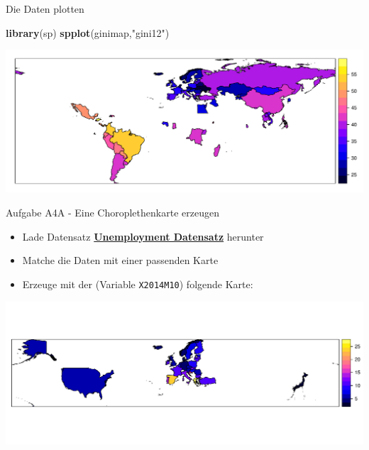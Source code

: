 \documentclass[ignorenonframetext,]{beamer}
\newenvironment{Shaded}{\begin{snugshade}}{\end{snugshade}}
\newcommand{\KeywordTok}[1]{\textcolor[rgb]{0.13,0.29,0.53}{\textbf{#1}}}
\newcommand{\NormalTok}[1]{#1}
\newcommand{\StringTok}[1]{\textcolor[rgb]{0.31,0.60,0.02}{#1}}
\providecommand{\tightlist}{%
  \setlength{\itemsep}{0pt}\setlength{\parskip}{0pt}}
\begin{document}
\begin{frame}[fragile]{Die Daten plotten}
\protect\hypertarget{die-daten-plotten}{}

\begin{Shaded}
\begin{Highlighting}[]
\KeywordTok{library}\NormalTok{(sp)}
\KeywordTok{spplot}\NormalTok{(ginimap,}\StringTok{"gini12"}\NormalTok{)}
\end{Highlighting}
\end{Shaded}

\includegraphics{Choroplethen_files/figure-beamer/unnamed-chunk-13-1.pdf}

\end{frame}

\begin{frame}[fragile]{Aufgabe A4A - Eine Choroplethenkarte erzeugen}
\protect\hypertarget{aufgabe-a4a---eine-choroplethenkarte-erzeugen}{}

\begin{itemize}
\tightlist
\item
  Lade Datensatz
  \href{https://raw.githubusercontent.com/Japhilko/GeoData/master/2015/data/Unemployment.csv}{\textbf{Unemployment
  Datensatz}} herunter
\item
  Matche die Daten mit einer passenden Karte
\item
  Erzeuge mit der (Variable \texttt{X2014M10}) folgende Karte:
\end{itemize}

\includegraphics{Choroplethen_files/figure-beamer/unnamed-chunk-14-1.pdf}

\end{frame}
\end{document}
